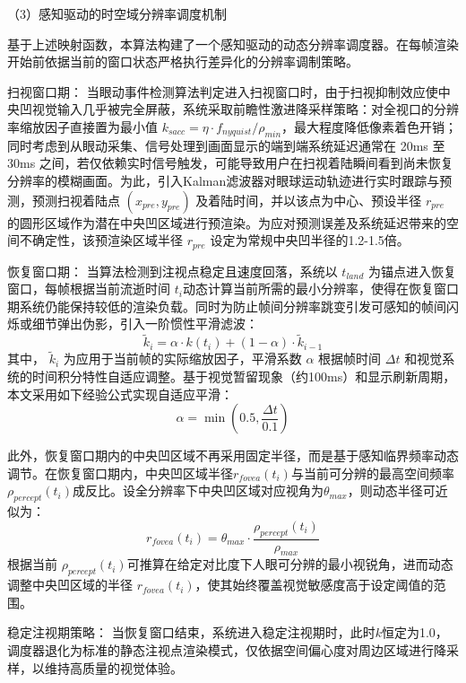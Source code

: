（3）感知驱动的时空域分辨率调度机制

基于上述映射函数，本算法构建了一个感知驱动的动态分辨率调度器。在每帧渲染开始前依据当前的窗口状态严格执行差异化的分辨率调制策略。

扫视窗口期：
当眼动事件检测算法判定进入扫视窗口时，由于扫视抑制效应使中央凹视觉输入几乎被完全屏蔽，系统采取前瞻性激进降采样策略：对全视口的分辨率缩放因子直接置为最小值 \(k_{sacc} = \eta \cdot f_{nyquist} / \rho_{min}\)，最大程度降低像素着色开销；同时考虑到从眼动采集、信号处理到画面显示的端到端系统延迟通常在 20ms 至 30ms 之间，若仅依赖实时信号触发，可能导致用户在扫视着陆瞬间看到尚未恢复分辨率的模糊画面。为此，引入Kalman滤波器对眼球运动轨迹进行实时跟踪与预测，预测扫视着陆点 $(x_{pre},y_{pre})$ 及着陆时间，并以该点为中心、预设半径 \(r_{pre}\) 的圆形区域作为潜在中央凹区域进行预渲染。为应对预测误差及系统延迟带来的空间不确定性，该预渲染区域半径 \(r_{pre}\) 设定为常规中央凹半径的1.2-1.5倍。

恢复窗口期：
当算法检测到注视点稳定且速度回落，系统以 $t_{land}$ 为锚点进入恢复窗口，每帧根据当前流逝时间 \(t_i\)动态计算当前所需的最小分辨率，使得在恢复窗口期系统仍能保持较低的渲染负载。同时为防止帧间分辨率跳变引发可感知的帧间闪烁或细节弹出伪影，引入一阶惯性平滑滤波：
\begin{equation}
\tilde{k}_i = \alpha \cdot k(t_i) + (1-\alpha) \cdot \tilde{k}_{i-1}
\label{eq:smoothing_filter}
\end{equation}
其中， \(\tilde{k}_i\) 为应用于当前帧的实际缩放因子，平滑系数 \(\alpha\) 根据帧时间 \(\Delta t\) 和视觉系统的时间积分特性自适应调整。基于视觉暂留现象（约100ms）和显示刷新周期，本文采用如下经验公式实现自适应平滑：
\begin{equation}
\alpha = \min\left(0.5, \frac{\Delta t}{0.1}\right)
\end{equation}

此外，恢复窗口期内的中央凹区域不再采用固定半径，而是基于感知临界频率动态调节。在恢复窗口期内，中央凹区域半径$r_{fovea}(t_i)$与当前可分辨的最高空间频率$\rho_{percept}(t_i)$成反比。设全分辨率下中央凹区域对应视角为$\theta_{max}$，则动态半径可近似为：
\begin{equation}
r_{fovea}(t_i) = \theta_{max} \cdot \frac{\rho_{percept}(t_i)}{\rho_{max}}
\end{equation}
根据当前 \(\rho_{percept}(t_i)\)可推算在给定对比度下人眼可分辨的最小视锐角，进而动态调整中央凹区域的半径 \(r_{fovea}(t_i)\)，使其始终覆盖视觉敏感度高于设定阈值的范围。

稳定注视期策略：
当恢复窗口结束，系统进入稳定注视期时，此时\(k\)恒定为1.0，调度器退化为标准的静态注视点渲染模式，仅依据空间偏心度对周边区域进行降采样，以维持高质量的视觉体验。

